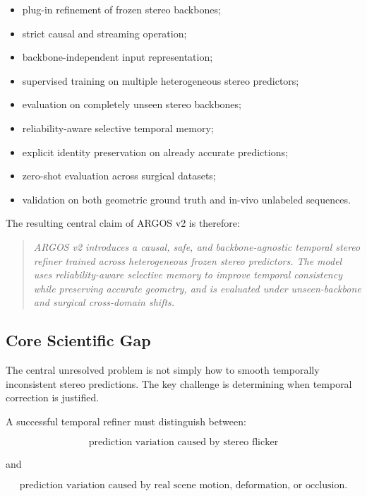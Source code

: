 \documentclass[11pt,a4paper]{article}
\begin{document}
\begin{itemize}
    \item plug-in refinement of frozen stereo backbones;
    \item strict causal and streaming operation;
    \item backbone-independent input representation;
    \item supervised training on multiple heterogeneous stereo predictors;
    \item evaluation on completely unseen stereo backbones;
    \item reliability-aware selective temporal memory;
    \item explicit identity preservation on already accurate predictions;
    \item zero-shot evaluation across surgical datasets;
    \item validation on both geometric ground truth and in-vivo unlabeled sequences.
\end{itemize}

The resulting central claim of ARGOS v2 is therefore:

\begin{quote}
\textit{ARGOS v2 introduces a causal, safe, and backbone-agnostic temporal stereo refiner trained across heterogeneous frozen stereo predictors. The model uses reliability-aware selective memory to improve temporal consistency while preserving accurate geometry, and is evaluated under unseen-backbone and surgical cross-domain shifts.}
\end{quote}

\subsection{Core Scientific Gap}

The central unresolved problem is not simply how to smooth temporally inconsistent stereo predictions. The key challenge is determining when temporal correction is justified.

A successful temporal refiner must distinguish between:

\begin{equation}
\text{prediction variation caused by stereo flicker}
\end{equation}

and

\begin{equation}
\text{prediction variation caused by real scene motion, deformation, or occlusion}.
\end{equation}
\end{document}

